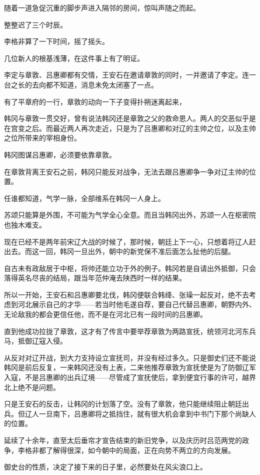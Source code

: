 随着一道急促沉重的脚步声进入隔邻的房间，惊叫声随之而起。

整整迟了三个时辰。

李格非算了一下时间，摇了摇头。

几位新人的根基浅薄，在这件事上有了明证。

李定与章敦、吕惠卿都有交情，王安石在邀请章敦的同时，一并邀请了李定。连一台之长的去向都不知道，消息未免太闭塞了一点。

有了平章府的一行，章敦的动向一下子变得扑朔迷离起来，

韩冈与章敦一贯交好，曾有说法韩冈还是章敦之父的救命恩人。两人的交恶似乎是在宫变之后。而最近两人再次走近，只是为了吕惠卿和对辽的主帅之位，以及主帅之位所带来的宰相身份。

韩冈图谋吕惠卿，必须要依靠章敦。

在章敦背离王安石之前，韩冈只能反对战争，无法去跟吕惠卿争一争对辽主帅的位置。

任谁都知道，气学一脉，全部维系在韩冈一人身上。

苏颂只能算是外围，不可能为气学全心全意。而且当韩冈出外，苏颂一人在枢密院也独木难支。

现在已经不是两年前宋辽大战的时候了，那时候，朝廷上下一心，只想着将辽人赶出去。而这一回，韩冈一旦出外，朝中的新党保不准后面怎么扯他的后腿。

自古未有政敌居于中枢，将帅还能立功于外的例子。韩冈若是自请出外抵御，只会落得英名尽丧的结局，跟当年范仲淹去陕西时一样的结果。

所以一开始，王安石和吕惠卿要北伐，韩冈便联合韩绛、张璪一起反对，绝不去考虑到河北展示自己的才华——若当时他毛遂自荐，要自己代替吕惠卿，朝野内外、无论敌我的都会更信任他，而不是在河北已有一段时间的吕惠卿。

直到他成功拉拢了章敦，这才有了传言中要举荐章敦为两路宣抚，统领河北河东兵马，抵御辽寇入侵。

从反对对辽开战，到大力支持设立宣抚司，并没有经过多久。只是御史们还不能说韩冈是前后反复，一来韩冈还没有上表，二来他推荐章敦为宣抚使是为了防御辽军入寇，不是吕惠卿的出兵辽境——尽管成了宣抚使后，拿到便宜行事的许可，越界北上绝不是问题。

只是王安石的反击，让韩冈的计划落了空。没有了章敦，他只能继续阻止朝廷出兵。但辽人一旦南下，吕惠卿将之抵挡住，就有很大机会拿到中书门下那个尚缺人的位置。

延续了十余年，直至太后垂帘才宣告结束的新旧党争，以及庆历时吕范两党的政争，李格非都了解得很深，如今朝中的局面，正在向势不两立的方向发展。

御史台的性质，决定了接下来的日子里，必然要处在风尖浪口上。

